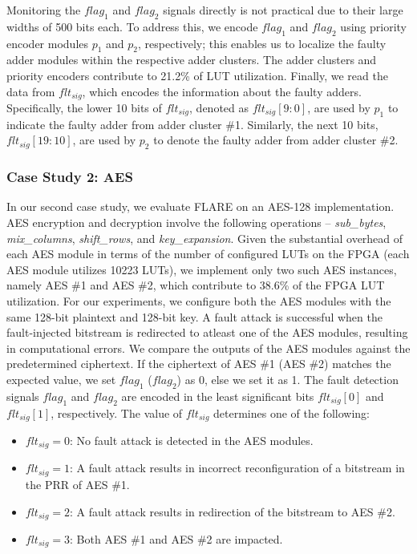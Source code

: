 Monitoring the $flag_1$ and $flag_2$ signals directly is not practical due to their large widths of 500 bits each. To address this, we encode $flag_1$  and $flag_2$ using priority encoder modules $p_1$ and $p_2$, respectively; this enables us to localize the faulty adder modules within the respective adder clusters. The adder clusters and priority encoders contribute to 21.2\% of LUT utilization. Finally, we read the data from $flt_{sig}$, which encodes the information about the faulty adders. Specifically, the lower 10 bits of $flt_{sig}$, denoted as $flt_{sig}[9:0]$, are used by $p_1$ to indicate the faulty adder from adder cluster \#1. Similarly, the next 10 bits, $flt_{sig}[19:10]$, are used by  $p_2$ to denote the faulty adder from adder cluster \#2.

\vspace{-0.1cm}

\subsubsection{Case Study 2: AES}
\vspace{-0.1cm}
In our second case study, we evaluate FLARE on an AES-128 implementation. AES encryption and decryption involve the following operations -- \textit{sub\_bytes}, \textit{mix\_columns}, \textit{shift\_rows}, and \textit{key\_expansion}. Given the substantial overhead of each AES module in terms of the number of configured LUTs on the FPGA (each AES module utilizes 10223 LUTs), we implement only two such AES instances, namely AES \#1 and AES \#2, which contribute to 38.6\% of the FPGA LUT utilization. For our experiments, we configure both the AES modules with the same 128-bit plaintext and 128-bit key. A fault attack is successful when the fault-injected bitstream is redirected to atleast one of the AES modules, resulting in computational errors. We compare the outputs of the AES modules against the predetermined ciphertext. If the ciphertext of AES \#1 (AES \#2) matches the expected value, we set $flag_1$ ($flag_2$) as 0, else we set it as 1. The fault detection signals
$flag_1$ and $flag_2$ are encoded in the least significant bits $flt_{sig}[0]$ and $flt_{sig}[1]$, respectively. The value of $flt_{sig}$ determines one of the following:
\begin{itemize}[leftmargin=*,topsep=0pt]
    \item $flt_{sig}=0$: No fault attack is detected in the AES modules.
    \item $flt_{sig}=1$: A fault attack results in incorrect reconfiguration of a bitstream in the PRR of AES \#1. 
    \item $flt_{sig}=2$: A fault attack results in redirection of the bitstream to AES \#2. 
    \item  $flt_{sig}=3$: Both AES \#1 and AES \#2 are impacted. 
\end{itemize}
\vspace{-0.1cm}





